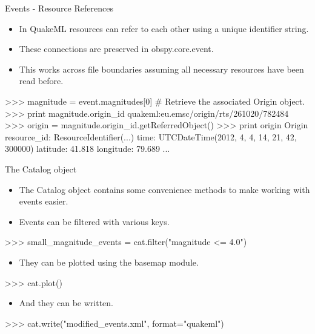 \begin{frame}{Events - Resource References}
    \begin{itemize}
        \item In QuakeML resources can refer to each other using a unique identifier string.
        \item These connections are preserved in obspy.core.event.
        \item This works across file boundaries assuming all necessary resources have been read before.
    \end{itemize}
\begin{myColorBox}{0.95}{}
\begin{python}
>>> magnitude = event.magnitudes[0]
# Retrieve the associated Origin object.
>>> print magnitude.origin_id
quakeml:eu.emsc/origin/rts/261020/782484
>>> origin = magnitude.origin_id.getReferredObject()
>>> print origin
Origin
  resource_id: ResourceIdentifier(...)
         time: UTCDateTime(2012, 4, 4, 14, 21, 42, 300000)
     latitude: 41.818
    longitude: 79.689
    ...
\end{python}
\end{myColorBox}
\end{frame}

\begin{frame}{The Catalog object}
    \begin{itemize}
        \item The Catalog object contains some convenience methods to make working with events easier.
        \item Events can be filtered with various keys.
    \end{itemize}
\begin{myColorBox}{0.95}{}
\begin{python}
>>> small_magnitude_events = cat.filter("magnitude <= 4.0")
\end{python}
\end{myColorBox}

    \begin{itemize}
        \item They can be plotted using the basemap module.
    \end{itemize}
\begin{myColorBox}{0.95}{}
\begin{python}
    >>> cat.plot()
\end{python}
\end{myColorBox}
    \begin{itemize}
        \item And they can be written.
    \end{itemize}
\begin{myColorBox}{0.95}{}
\begin{python}
>>> cat.write("modified_events.xml", format="quakeml")
\end{python}
\end{myColorBox}
\end{frame}

